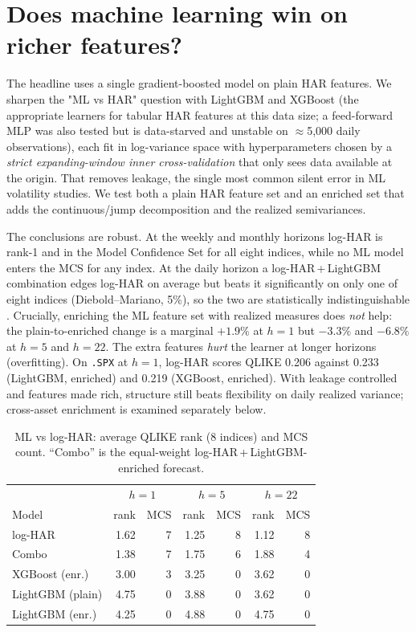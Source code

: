 \documentclass[11pt]{article}
\begin{document}
\section{Does machine learning win on richer features?}
The headline uses a single gradient-boosted model on plain HAR features. We
sharpen the "ML vs HAR" question with LightGBM and XGBoost (the appropriate
learners for tabular HAR features at this data size; a feed-forward MLP was also
tested but is data-starved and unstable on $\approx$5{,}000 daily observations),
each fit in log-variance space with hyperparameters chosen by a \emph{strict
expanding-window inner cross-validation} that only sees data available at the
origin. That removes leakage, the single most common silent error in ML volatility
studies. We test both a plain HAR feature set and an enriched set that adds the
continuous/jump decomposition and the realized semivariances.

The conclusions are robust. At the weekly and monthly horizons log-HAR
is rank-1 and in the Model Confidence Set for all eight indices, while no ML model
enters the MCS for any index. At the daily horizon a log-HAR\,+\,LightGBM
combination edges log-HAR on average but beats it significantly on only one of
eight indices (Diebold--Mariano, 5\%), so the two are statistically
indistinguishable \cite{dm1995}. Crucially, enriching the ML feature set with realized measures
does \emph{not} help: the plain-to-enriched change is a marginal $+1.9\%$ at
$h=1$ but $-3.3\%$ and $-6.8\%$ at $h=5$ and $h=22$. The extra features
\emph{hurt} the learner at longer horizons (overfitting). On \texttt{.SPX} at
$h=1$, log-HAR scores QLIKE 0.206 against 0.233 (LightGBM, enriched) and 0.219
(XGBoost, enriched). With leakage controlled and features made rich, structure
still beats flexibility on daily realized variance; cross-asset enrichment is
examined separately below.

\begin{table}[h]
\centering
\caption{ML vs log-HAR: average QLIKE rank (8 indices) and MCS count. ``Combo''
is the equal-weight log-HAR\,+\,LightGBM-enriched forecast.}
\label{tab:ml}
\begin{tabular}{lrrrrrr}
\toprule
 & \multicolumn{2}{c}{$h=1$} & \multicolumn{2}{c}{$h=5$} & \multicolumn{2}{c}{$h=22$} \\
Model & rank & MCS & rank & MCS & rank & MCS \\
\midrule
log-HAR        & 1.62 & 7 & 1.25 & 8 & 1.12 & 8 \\
Combo          & 1.38 & 7 & 1.75 & 6 & 1.88 & 4 \\
XGBoost (enr.) & 3.00 & 3 & 3.25 & 0 & 3.62 & 0 \\
LightGBM (plain)& 4.75 & 0 & 3.88 & 0 & 3.62 & 0 \\
LightGBM (enr.)& 4.25 & 0 & 4.88 & 0 & 4.75 & 0 \\
\bottomrule
\end{tabular}
\end{table}
\end{document}
